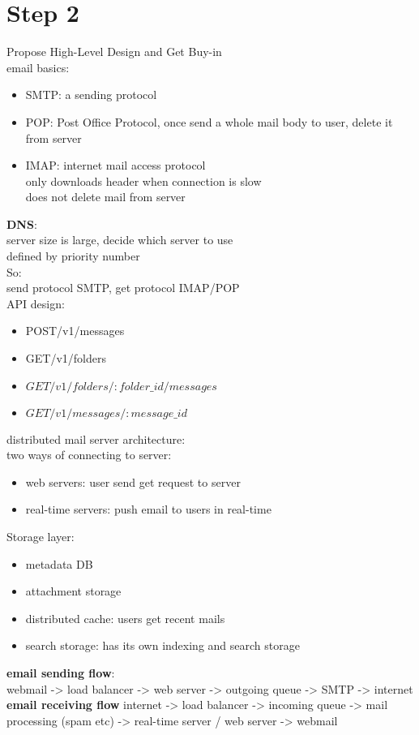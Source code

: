 \documentclass{article}
\begin{document}
\section{Step 2}
Propose High-Level Design and Get Buy-in\\
email basics:
\begin{itemize}
    \item SMTP: a sending protocol
    \item POP: Post Office Protocol, once send a whole mail body to user, delete it from server
    \item IMAP: internet mail access protocol\\
    only downloads header when connection is slow\\
    does not delete mail from server\\
\end{itemize}
\textbf{DNS}:\\
server size is large, decide which server to use\\
defined by priority number\\
So:\\
send protocol SMTP, get protocol IMAP/POP\\
API design:
\begin{itemize}
    \item POST/v1/messages
    \item GET/v1/folders
    \item $GET/v1/folders/{:folder\_id}/messages$
    \item $GET/v1/ messages/{:message\_id}$
\end{itemize}
distributed mail server architecture:\\
two ways of connecting to server:\\
\begin{itemize}
    \item web servers: user send get request to server
    \item real-time servers: push email to users in real-time
\end{itemize}
Storage layer:
\begin{itemize}
    \item metadata DB
    \item attachment storage
    \item distributed cache: users get recent mails
    \item search storage: has its own indexing and search storage
\end{itemize}
\textbf{email sending flow}:\\
webmail -> load balancer -> web server -> outgoing queue -> SMTP -> internet\\
\textbf{email receiving flow}
internet -> load balancer -> incoming queue -> mail processing (spam etc) -> real-time server / web server -> webmail\\
\end{document}
